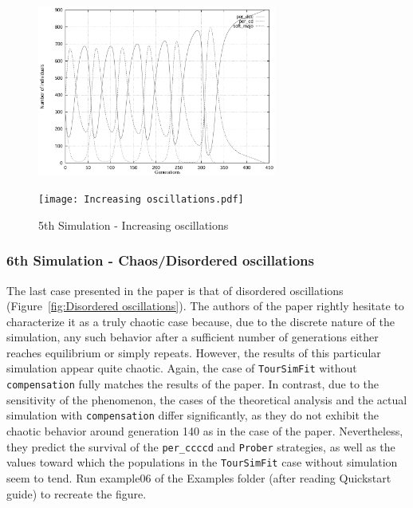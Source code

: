 	\begin{figure}[h]
	    \centering
		\includegraphics[width=0.7\textwidth]{RefPaperFigures/fig5.jpeg}\par\vspace{0.5em}
	    \texttt{[image: Increasing oscillations.pdf]}
	    \caption{5th Simulation - Increasing oscillations}
	    \label{fig:Increasing oscillations}
	\end{figure}
\subsubsection{6th Simulation - Chaos/Disordered oscillations}
The last case presented in the paper is that of disordered oscillations (Figure~\ref{fig:Disordered oscillations}). The authors of the paper rightly hesitate to characterize it as a truly chaotic case because, due to the discrete nature of the simulation, any such behavior after a sufficient number of generations either reaches equilibrium or simply repeats. However, the results of this particular simulation appear quite chaotic. Again, the case of \texttt{TourSimFit} without \texttt{compensation} fully matches the results of the paper. In contrast, due to the sensitivity of the phenomenon, the cases of the theoretical analysis and the actual simulation with \texttt{compensation} differ significantly, as they do not exhibit the chaotic behavior around generation 140 as in the case of the paper. Nevertheless, they predict the survival of the \texttt{per\_ccccd} and \texttt{Prober} strategies, as well as the values toward which the populations in the \texttt{TourSimFit} case without simulation seem to tend. Run example06 of the Examples folder (after reading Quickstart guide) to recreate the figure.

